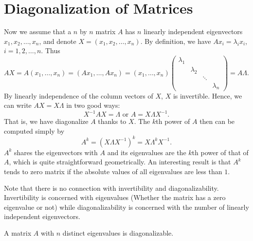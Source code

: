 \section{Diagonalization of Matrices}
Now we assume that a $n$ by $n$ matrix $A$ has $n$ linearly independent 
eigenvectors $x_1, x_2, \ldots, x_n$, and denote $X = (x_1, x_2, \ldots, 
x_n)$. By definition, we have $Ax_i = \lambda_i x_i$, $i = 1, 2, \ldots, n$.
Thus 
\begin{equation}
    AX = A(x_1, \ldots, x_n) = (Ax_1, \ldots, Ax_n)
    = (x_1, \ldots, x_n) \begin{pmatrix}
    \lambda_{1}    &                  &        &                   \\
                   & \lambda_2        &        &                   \\
                   &                  & \ddots &                   \\
                   &                  &        & \lambda_n
    \end{pmatrix} 
    = A \Lambda. 
\end{equation}
By linearly independence of the column vectors of $X$, $X$ is invertible. 
Hence, we can write $AX = X\Lambda$ in two good ways:
\begin{equation}
    X^{-1} A X = \Lambda \textrm{ or } A = X \Lambda X^{-1}. 
\end{equation}
That is, we have diagonalize $A$ thanks to $X$. The $k$th power of $A$ then 
can be computed simply by 
\begin{equation}
    A^k = (X\Lambda X^{-1})^k = X\Lambda^k X^{-1}.
\end{equation}
$A^k$ shares the eigenvectors with $A$ and its eigenvalues are the $k$th 
power of that of $A$, which is quite straightforward geometrically. An 
interesting result is that $A^k$ tends to zero matrix if the absolute 
values of all eigenvalues are less than $1$.

\begin{rmk}
Note that there is no connection with invertibility and 
diagonalizability. Invertibility is concerned with eigenvalues (Whether the 
matrix has a zero eigenvalue or not) while diagonalizability is concerned 
with the number of linearly independent eigenvectors. 
\end{rmk}

\begin{thm}
A matrix $A$ with $n$ distinct eigenvalues is diagonalizable.
\end{thm}

